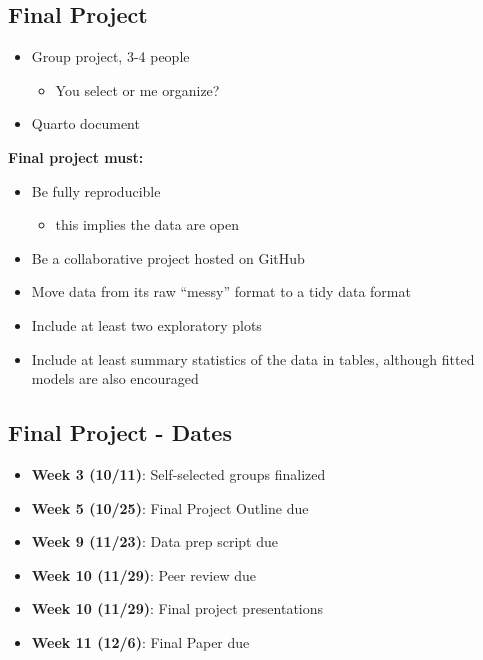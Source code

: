 \documentclass[
  letterpaper,
  DIV=11,
  numbers=noendperiod,
  oneside]{scrartcl}
\providecommand{\tightlist}{%
  \setlength{\itemsep}{0pt}\setlength{\parskip}{0pt}}\usepackage{longtable,booktabs,array}
\begin{document}
\hypertarget{final-project}{%
\subsection{Final Project}\label{final-project}}

\begin{itemize}
\tightlist
\item
  Group project, 3-4 people

  \begin{itemize}
  \tightlist
  \item
    You select or me organize?
  \end{itemize}
\item
  Quarto document
\end{itemize}

\textbf{Final project must:}

\begin{itemize}
\tightlist
\item
  Be fully reproducible

  \begin{itemize}
  \tightlist
  \item
    this implies the data are open
  \end{itemize}
\item
  Be a collaborative project hosted on GitHub
\item
  Move data from its raw ``messy'' format to a tidy data format
\item
  Include at least two exploratory plots
\item
  Include at least summary statistics of the data in tables, although
  fitted models are also encouraged
\end{itemize}

\hypertarget{final-project---dates}{%
\subsection{Final Project - Dates}\label{final-project---dates}}

\begin{itemize}
\tightlist
\item
  \textbf{Week 3 (10/11)}: Self-selected groups finalized
\item
  \textbf{Week 5 (10/25)}: Final Project Outline due
\item
  \textbf{Week 9 (11/23)}: Data prep script due
\item
  \textbf{Week 10 (11/29)}: Peer review due
\item
  \textbf{Week 10 (11/29)}: Final project presentations
\item
  \textbf{Week 11 (12/6)}: Final Paper due
\end{itemize}
\end{document}
